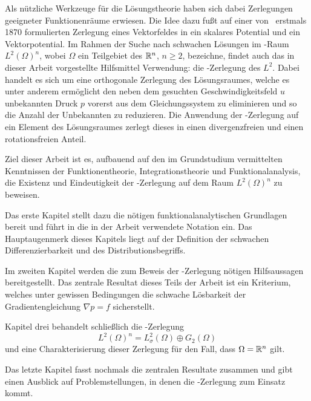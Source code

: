 Als nützliche Werkzeuge für die Lösungstheorie haben sich dabei Zerlegungen geeigneter Funktionenräume erwiesen. Die Idee dazu fußt auf einer von \helmholtz\ erstmals 1870 formulierten Zerlegung eines Vektorfeldes in ein skalares Potential und ein Vektorpotential.
Im Rahmen der Suche nach schwachen Lösungen im \hilbert\hyp{}Raum $L^2(\Omega)^n$, wobei $\Omega$ ein Teilgebiet des $\mathbb{R}^n$, $n \geq 2$, bezeichne, findet auch das in dieser Arbeit vorgestellte Hilfsmittel Verwendung: die \helmholtz\hyp{}Zerlegung des $L^2$.
Dabei handelt es sich um eine orthogonale Zerlegung des Lösungsraumes, welche es unter anderem ermöglicht den neben dem gesuchten Geschwindigkeitsfeld $u$ unbekannten Druck $p$ vorerst aus dem Gleichungssystem zu eliminieren und so die Anzahl der Unbekannten zu reduzieren.
Die Anwendung der \helmholtz\hyp{}Zerlegung auf ein Element des Lösungsraumes zerlegt dieses in einen divergenzfreien und einen rotationsfreien Anteil.

Ziel dieser Arbeit ist es, aufbauend auf den im Grundstudium vermittelten Kenntnissen der Funktionentheorie, Integrationstheorie und Funktionalanalysis, die Existenz und Eindeutigkeit der \helmholtz\hyp{}Zerlegung auf dem Raum $L^2(\Omega)^n$ zu beweisen.

Das erste Kapitel stellt dazu die nötigen funktionalanalytischen Grundlagen bereit und führt in die in der Arbeit verwendete Notation ein.
Das Hauptaugenmerk dieses Kapitels liegt auf der Definition der schwachen Differenzierbarkeit und des Distributionsbegriffs.

Im zweiten Kapitel werden die zum Beweis der \helmholtz\hyp{}Zerlegung nötigen Hilfsaussagen bereitgestellt.
Das zentrale Resultat dieses Teils der Arbeit ist ein Kriterium, welches unter gewissen Bedingungen die schwache Lösbarkeit der Gradientengleichung $\nabla p = f$ sicherstellt.

Kapitel drei behandelt schließlich die \helmholtz\hyp{}Zerlegung $$L^2(\Omega)^n = L^2_\sigma(\Omega) \oplus G_2(\Omega)$$ und eine Charakterisierung dieser Zerlegung für den Fall, dass $\Omega = \mathbb{R}^n$ gilt.

Das letzte Kapitel fasst nochmals die zentralen Resultate zusammen und gibt einen Ausblick auf Problemstellungen, in denen die \helmholtz\hyp{}Zerlegung zum Einsatz kommt.
